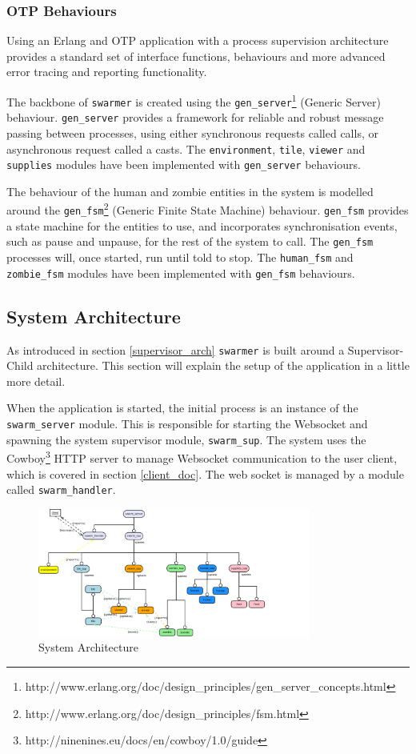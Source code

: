 \subsubsection{OTP Behaviours}
\label{otp_behaviours}
Using an Erlang and OTP application with a process supervision architecture provides a standard set of interface functions, behaviours and more advanced error tracing and reporting functionality.

The backbone of \verb+swarmer+ is created using the \verb+gen_server+\footnote{http://www.erlang.org/doc/design\_principles/gen\_server\_concepts.html} (Generic Server) behaviour. \verb+gen_server+ provides a framework for reliable and robust message passing between processes, using either synchronous requests called calls, or asynchronous request called a casts. The \verb+environment+, \verb+tile+, \verb+viewer+ and \verb+supplies+ modules have been implemented with \verb+gen_server+ behaviours.

The behaviour of the human and zombie entities in the system is modelled around the \verb+gen_fsm+\footnote{http://www.erlang.org/doc/design\_principles/fsm.html} (Generic Finite State Machine) behaviour. \verb+gen_fsm+ provides a state machine for the entities to use, and incorporates synchronisation events, such as pause and unpause, for the rest of the system to call. The \verb+gen_fsm+ processes will, once started, run until told to stop. The \verb+human_fsm+ and \verb+zombie_fsm+ modules have been implemented with \verb+gen_fsm+ behaviours.

\subsection{System Architecture}
\label{sys_overview_architecture}
As introduced in section \ref{supervisor_arch} \verb+swarmer+ is built around a Supervisor-Child architecture. This section will explain the setup of the application in a little more detail.

When the application is started, the initial process is an instance of the \verb+swarm_server+ module. This is responsible for starting the Websocket and spawning the system supervisor module, \verb+swarm_sup+. The system uses the Cowboy\footnote{http://ninenines.eu/docs/en/cowboy/1.0/guide} HTTP server to manage Websocket communication to the user client, which is covered in section \ref{client_doc}. The web socket is managed by a module called \verb+swarm_handler+.

\begin{figure}[h]
  \centering
  \includegraphics[width=0.8\textwidth]{img/final_system_ws.png}
\caption{System Architecture}
    \label{fig:system_ws}
\end{figure}

